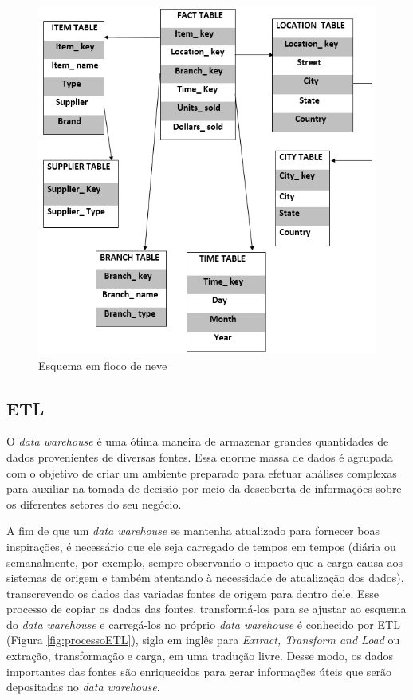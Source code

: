\begin{figure}[ht]
\centering
\includegraphics[width=.8\textwidth]{imagens/example-snowflake-schema.jpg}
\caption{Esquema em floco de neve}
\author{Fonte: https://www.educba.com/star-schema-vs-snowflake-schema/}
\label{fig:esquemaFlocoNeve}
\end{figure}

\subsection{ETL}
\label{subsec:etl}
O \textit{data warehouse} é uma ótima maneira de armazenar grandes quantidades de dados provenientes de diversas fontes. Essa enorme massa de dados é agrupada com o objetivo de criar um ambiente preparado para efetuar análises complexas para auxiliar na tomada de decisão por meio da descoberta de informações sobre os diferentes setores do seu negócio.

A fim de que um \textit{data warehouse} se mantenha atualizado para fornecer boas inspirações, é necessário que ele seja carregado de tempos em tempos (diária ou semanalmente, por exemplo, sempre observando o impacto que a carga causa aos sistemas de origem e também atentando à necessidade de atualização dos dados), transcrevendo os dados das variadas fontes de origem para dentro dele. Esse processo de copiar os dados das fontes, transformá-los para se ajustar ao esquema do \textit{data warehouse} e carregá-los no próprio \textit{data warehouse} é conhecido por ETL (Figura \ref{fig:processoETL}), sigla em inglês para \textit{Extract, Transform and Load} ou extração, transformação e carga, em uma tradução livre. Desse modo, os dados importantes das fontes são enriquecidos para gerar informações úteis que serão depositadas no \textit{data warehouse}.

